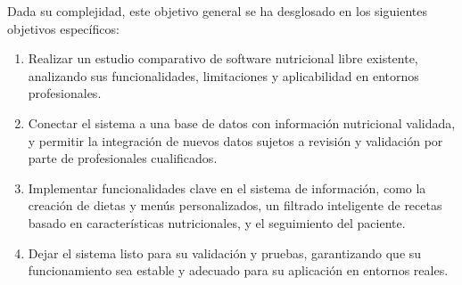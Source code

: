 Dada su complejidad, este objetivo general se ha desglosado en los siguientes objetivos específicos:
\begin{enumerate}
    \item Realizar un estudio comparativo de software nutricional libre existente, analizando sus funcionalidades, limitaciones y aplicabilidad en entornos profesionales.
    \item Conectar el sistema a una base de datos con información nutricional validada, y permitir la integración de nuevos datos sujetos a revisión y validación por parte de profesionales cualificados.
    \item Implementar funcionalidades clave en el sistema de información, como la creación de dietas y menús personalizados, un filtrado inteligente de recetas basado en características nutricionales, y el seguimiento del paciente.
    \item Dejar el sistema listo para su validación y pruebas, garantizando que su funcionamiento sea estable y adecuado para su aplicación en entornos reales.
\end{enumerate}

